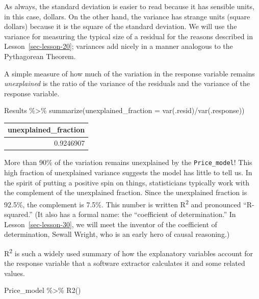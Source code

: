 \documentclass[
  letterpaper,
  DIV=11,
  numbers=noendperiod,
  oneside]{scrreprt}
\newenvironment{Shaded}{\begin{snugshade}}{\end{snugshade}}
\newcommand{\AttributeTok}[1]{\textcolor[rgb]{0.40,0.45,0.13}{#1}}
\newcommand{\FunctionTok}[1]{\textcolor[rgb]{0.28,0.35,0.67}{#1}}
\newcommand{\NormalTok}[1]{\textcolor[rgb]{0.00,0.23,0.31}{#1}}
\newcommand{\SpecialCharTok}[1]{\textcolor[rgb]{0.37,0.37,0.37}{#1}}
\begin{document}
As always, the standard deviation is easier to read because it has
sensible units, in this case, dollars. On the other hand, the variance
has strange units (square dollars) because it is the square of the
standard deviation. We will use the variance for measuring the typical
size of a residual for the reasons described in
Lesson~\ref{sec-lesson-20}; variances add nicely in a manner analogous
to the Pythagorean Theorem.

A simple measure of how much of the variation in the response variable
remains \emph{unexplained} is the ratio of the variance of the residuals
and the variance of the response variable.

\begin{Shaded}
\begin{Highlighting}[]
\NormalTok{Results }\SpecialCharTok{\%\textgreater{}\%} \FunctionTok{summarize}\NormalTok{(}\AttributeTok{unexplained\_fraction =} \FunctionTok{var}\NormalTok{(.resid)}\SpecialCharTok{/}\FunctionTok{var}\NormalTok{(.response))}
\end{Highlighting}
\end{Shaded}

\ttfamily 
\begin{tabular}{r}
\toprule
unexplained\_fraction\\
\midrule
0.9246907\\
\bottomrule
\end{tabular} \normalfont
\bigskip

More than 90\% of the variation remains unexplained by the
\texttt{Price\_model}! This high fraction of unexplained variance
suggests the model has little to tell us. In the spirit of putting a
positive spin on things, statisticians typically work with the
complement of the unexplained fraction. Since the unexplained fraction
is 92.5\%, the complement is 7.5\%. This number is written
R\textsuperscript{2} and pronounced ``R-squared.'' (It also has a formal
name: the ``coefficient of determination.'' In
Lesson~\ref{sec-lesson-30}, we will meet the inventor of the coefficient
of determination, Sewall Wright, who is an early hero of causal
reasoning.)

R\textsuperscript{2} is such a widely used summary of how the
explanatory variables account for the response variable that a software
extractor calculates it and some related values.

\begin{Shaded}
\begin{Highlighting}[]
\NormalTok{Price\_model }\SpecialCharTok{\%\textgreater{}\%} \FunctionTok{R2}\NormalTok{()}
\end{Highlighting}
\end{Shaded}
\end{document}

